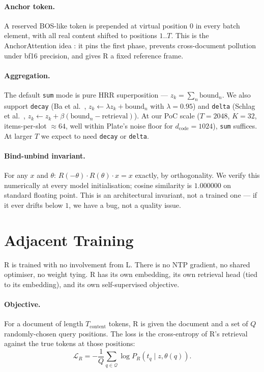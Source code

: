 \documentclass[10pt, twocolumn, a4paper]{article}
\begin{document}
\paragraph{Anchor token.} A reserved BOS-like token is prepended at virtual position $0$ in every batch element, with all real content shifted to positions $1..T$. This is the AnchorAttention idea \cite{wang2024bf16rope}: it pins the first phase, prevents cross-document pollution under bf16 precision, and gives R a fixed reference frame.

\paragraph{Aggregation.} The default \texttt{sum} mode is pure HRR superposition --- $z_k = \sum_n \text{bound}_n$. We also support \texttt{decay} (Ba et al.~\cite{ba2016fastweights}, $z_k \leftarrow \lambda z_k + \text{bound}_n$ with $\lambda = 0.95$) and \texttt{delta} (Schlag et al.~\cite{schlag2021lineartransformers}, $z_k \leftarrow z_k + \beta(\text{bound}_n - \text{retrieval})$). At our PoC scale ($T=2048$, $K=32$, items-per-slot $\approx 64$, well within Plate's noise floor for $d_{\text{code}}=1024$), \texttt{sum} suffices. At larger $T$ we expect to need \texttt{decay} or \texttt{delta}.

\paragraph{Bind-unbind invariant.} For any $x$ and $\theta$: $R(-\theta) \cdot R(\theta) \cdot x = x$ exactly, by orthogonality. We verify this numerically at every model initialisation; cosine similarity is $1.000000$ on standard floating point. This is an architectural invariant, not a trained one --- if it ever drifts below $1$, we have a bug, not a quality issue.


\section{Adjacent Training}
\label{sec:training}

R is trained with no involvement from L. There is no NTP gradient, no shared optimiser, no weight tying. R has its own embedding, its own retrieval head (tied to its embedding), and its own self-supervised objective.

\paragraph{Objective.} For a document of length $T_{\text{content}}$ tokens, R is given the document and a set of $Q$ randomly-chosen query positions. The loss is the cross-entropy of R's retrieval against the true tokens at those positions:
\begin{equation}
\mathcal{L}_R = -\frac{1}{Q}\sum_{q \in \mathcal{Q}} \log P_R(t_q \mid z, \theta(q)).
\end{equation}
\end{document}
